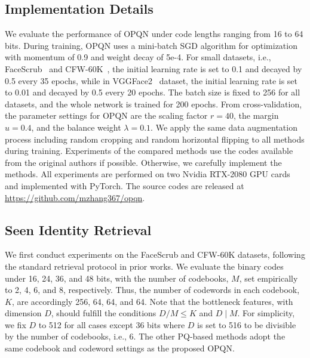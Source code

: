 \documentclass{elsarticle}
\begin{document}
\subsection{Implementation Details}
We evaluate the performance of OPQN under code lengths ranging from 16 to 64 bits. During training, OPQN uses a mini-batch SGD algorithm for optimization with momentum of 0.9 and weight decay of 5e-4. For small datasets, i.e., FaceScrub~\cite{ng2014data} and CFW-60K~\cite{li2015two}, the initial learning rate is set to 0.1 and decayed by 0.5 every 35 epochs, while in VGGFace2~\cite{cao2018vggface2} dataset,
the initial learning rate is set to 0.01 and decayed by 0.5 every 20 epochs. The batch size is fixed to 256 for all datasets, and the whole network is trained for 200 epochs. From cross-validation, the parameter settings for OPQN are the scaling factor $r=40$, the margin $u=0.4$, and the balance weight $\lambda=0.1$.
We apply the same data augmentation process including random cropping and random horizontal flipping to all methods during training. Experiments of the compared methods use the codes available from the original authors if possible. Otherwise, we carefully implement the methods. All experiments are performed on two Nvidia RTX-2080 GPU cards and implemented with PyTorch. The source codes are released at \url{https://github.com/mzhang367/opqn}.

\subsection{Seen Identity Retrieval}
We first conduct experiments on the FaceScrub and CFW-60K datasets, following the standard retrieval protocol in prior works. We evaluate the binary codes under 16, 24, 36, and 48 bits, with the number of codebooks, $M$, set empirically to 2, 4, 6, and 8, respectively. Thus, the number of codewords in each codebook, $K$, are accordingly 256, 64, 64, and 64. Note that the bottleneck features, with dimension $D$, should fulfill the conditions $D/M \leq K$ and $D \mid M$. For simplicity, we fix $D$ to 512 for all cases except 36 bits where $D$ is set to 516 to be divisible by the number of codebooks, i.e., 6. The other PQ-based methods adopt the same codebook and codeword settings as the proposed OPQN. 
\end{document}

